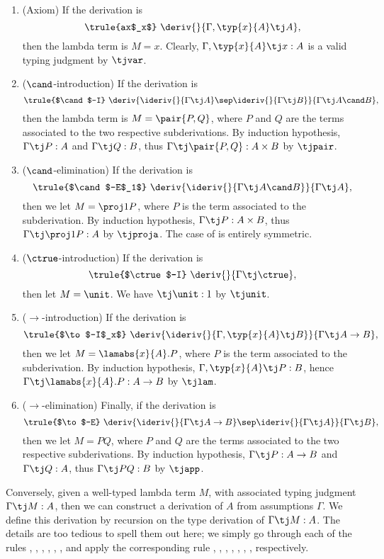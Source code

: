 \documentclass[12pt]{article}
\begin{document}
\begin{enumerate}
\item (Axiom) If the derivation is
\[ \trule{ax$_x$}\ \deriv{}{\Gamma,\typ{x}{A}\tj A},
\]
then the lambda term is $M=x$. Clearly, $\Gamma,\typ{x}{A}\tj x:A$ is
a valid typing judgment by $\tjvar$.
\item ($\cand$-introduction)
If the derivation is
\[ \trule{$\cand$-I}\ \deriv{\ideriv{}{\Gamma\tj A}\sep\ideriv{}{\Gamma\tj B}}{\Gamma\tj A\cand B},
\]
then the lambda term is $M=\pair{P,Q}$, where $P$ and $Q$ are the
terms associated to the two respective subderivations. By induction
hypothesis, $\Gamma\tj P:A$ and $\Gamma\tj Q:B$, thus
$\Gamma\tj\pair{P,Q}:A\times B$ by $\tjpair$.
\item ($\cand$-elimination)
If the derivation is
\[ \trule{$\cand$-E$_1$}\ \deriv{\ideriv{}{\Gamma\tj A\cand B}}{\Gamma\tj A},
\]
then we let $M=\proj1 P$, where $P$ is the term associated to the
subderivation. By induction hypothesis, $\Gamma\tj P:A\times B$, thus
$\Gamma\tj\proj1 P:A$ by $\tjproja$. The case of
{} is entirely symmetric.
\item ($\ctrue$-introduction)
If the derivation is
\[ \trule{$\ctrue$-I}\ \deriv{}{\Gamma\tj\ctrue},
\]
then let $M=\unit$. We have $\tj\unit:1$ by $\tjunit$.
\item ($\to$-introduction)
If the derivation is
\[ \trule{$\to$-I$_x$}\ \deriv{\ideriv{}{\Gamma,\typ{x}{A}\tj B}}{\Gamma\tj A\to B},
\]
then we let $M=\lamabs{x}{A}.P$, where $P$ is the term associated to
the subderivation. By induction hypothesis, $\Gamma,\typ{x}{A}\tj
P:B$, hence $\Gamma\tj \lamabs{x}{A}.P:A\to B$ by $\tjlam$.
\item ($\to$-elimination)
Finally, if the derivation is
\[ \trule{$\to$-E}\ \deriv{\ideriv{}{\Gamma\tj A\to B}\sep \ideriv{}{\Gamma\tj A}}{\Gamma\tj B},
\]
then we let $M=PQ$, where $P$ and $Q$ are the terms associated to the
two respective subderivations. By induction hypothesis, $\Gamma\tj
P:A\to B$ and $\Gamma\tj Q:A$, thus $\Gamma\tj PQ: B$ by $\tjapp$.
\end{enumerate}

Conversely, given a well-typed lambda term $M$, with associated typing
judgment $\Gamma\tj M:A$, then we can construct a derivation of $A$
from assumptions $\Gamma$. We define this derivation by recursion on
the type derivation of $\Gamma\tj M:A$. The details are too tedious to
spell them out here; we simply go through each of the rules {\tjvar},
{\tjlam}, {\tjapp}, {\tjpair}, {\tjproja}, {\tjprojb}, {\tjunit} and
apply the corresponding rule {}, {},
{}, {}, {},
{}, {}, respectively.
\end{document}
